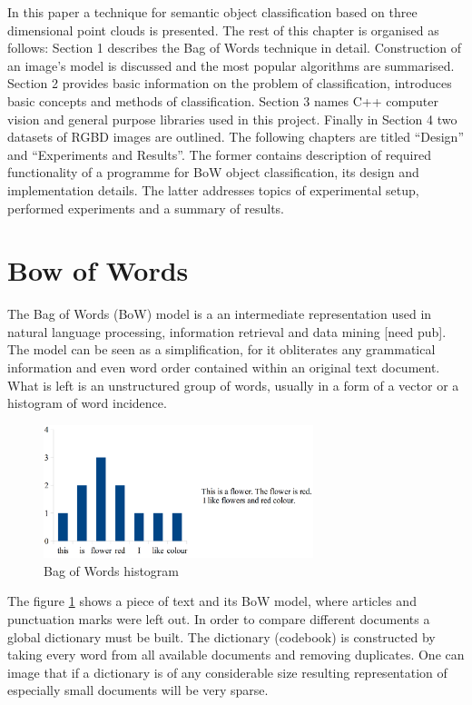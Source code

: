 	In this paper a technique for semantic object classification based on three dimensional point clouds is presented. The rest of this chapter is organised as follows: Section 1 describes the Bag of Words technique in detail. Construction of an image's model is discussed and the most popular algorithms are summarised. Section 2 provides basic information on the problem of classification, introduces basic concepts and methods of classification. Section 3 names C++ computer vision and general purpose libraries used in this project. Finally in Section 4 two datasets of RGBD images are outlined. The following chapters are titled ``Design'' and ``Experiments and Results''. The former contains description of required functionality of a programme for BoW object classification, its design and implementation details. The latter addresses topics of experimental setup, performed experiments and a summary of results. 
	
\section{Bow of Words}

	The Bag of Words (BoW) model is a an intermediate representation used in natural language processing, information retrieval and data mining [need pub]. The model can be seen as a simplification, for it obliterates any grammatical information and even word order contained within an original text document. What is left is an unstructured group of words, usually in a form of a vector or a histogram of word incidence.

	\begin{figure}[!ht]
	\centering
	\includegraphics[width=0.7\textwidth]{figs/bow_example}
	\caption{Bag of Words histogram}
	\label{fig:bow_example}
	\end{figure}
	
	The figure \ref{fig:bow_example} shows a piece of text and its BoW model, where articles and punctuation marks were left out. In order to compare different documents a global dictionary must be built. The dictionary (codebook) is constructed by taking every word from all available documents and removing duplicates. One can image that if a dictionary is of any considerable size resulting representation of especially small documents will be very sparse.

